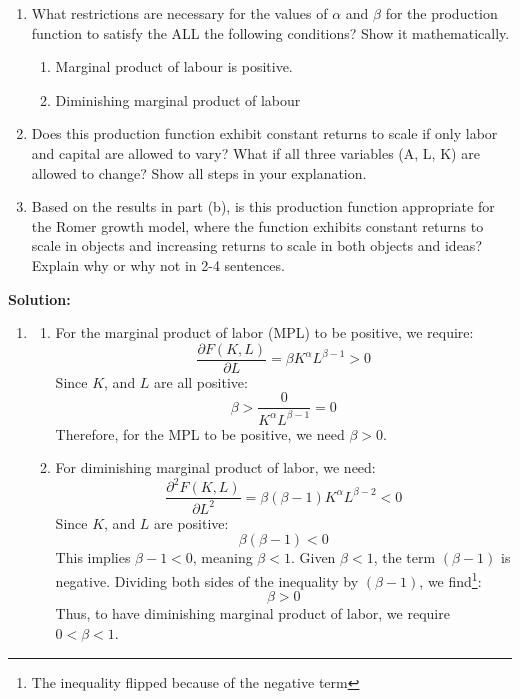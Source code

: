 \documentclass[14pt, oneside]{memoir}
\begin{document}
\begin{enumerate}[label=\textbf{\arabic*.}, itemsep=15pt]
\begin{enumerate}[label=(\alph*)]
	\item  What restrictions are necessary for the values of $\alpha$ and $\beta$ for the production function to satisfy the ALL the following conditions? Show it mathematically.
	\begin{enumerate}[label=(\roman*)]
		\item Marginal product of labour is positive.
		\item Diminishing marginal product of labour
	\end{enumerate}
	\clearpage
	\item Does this production function exhibit constant returns to scale if only labor and capital are allowed to vary? What if all three variables (A, L, K) are allowed to change? Show all steps in your explanation.
	
	\vspace{10cm}
	\item Based on the results in part (b), is this production function appropriate for the Romer growth model, where the function exhibits constant returns to scale in objects and increasing returns to scale in both objects and ideas? Explain why or why not in 2-4 sentences.
\end{enumerate}

\clearpage

\textbf{Solution:}
\begin{enumerate}[label=(\alph*)]
	\item 
	\begin{enumerate}[label=(\roman*)]
		\item For the marginal product of labor (MPL) to be positive, we require:
		\[
		\frac{\partial F(K,L)}{\partial L} = \beta  K^\alpha L^{\beta - 1} > 0
		\]
		Since  \(K\), and \(L\) are all positive:
		\[
		\beta > \frac{0}{ K^\alpha L^{\beta - 1}} = 0
		\]
		Therefore, for the MPL to be positive, we need \(\beta > 0\).
		
		
		\item For diminishing marginal product of labor, we need:
		\[
		\frac{\partial^2 F(K,L)}{\partial L^2} = \beta (\beta - 1)  K^\alpha L^{\beta - 2} < 0
		\]
		Since \(K\), and \(L\) are positive:
		\[
		\beta(\beta - 1) < 0
		\]
		This implies \(\beta - 1 < 0\), meaning \(\beta < 1\). Given \(\beta < 1\), the term \((\beta - 1)\) is negative. Dividing both sides of the inequality by \((\beta - 1)\), we find\footnote{The inequality flipped because of the negative term}:
		\[
		\beta > 0
		\]
		Thus, to have diminishing marginal product of labor, we require \(0 < \beta < 1\).
		

\end{enumerate}
\end{enumerate}
\end{enumerate}
\end{document}
